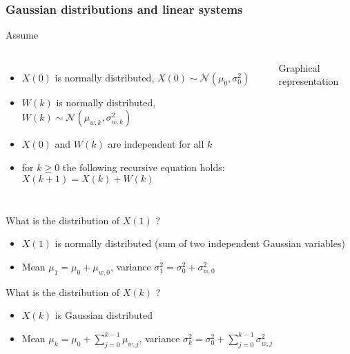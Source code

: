 \begin{frame}
	\frametitle{Gaussian distributions and linear systems}
	Assume 
	\begin{columns}
		\begin{itemize}
			\item $X(0)$ is normally distributed, $X(0)\sim\mathcal{N}(\mu_0, \sigma_0^2)$
			\item $W(k)$ is normally distributed, $W(k)\sim\mathcal{N}(\mu_{w,k}, \sigma_{w,k}^2)$
			\item $X(0)$ and $W(k)$ are independent for all $k$
			\item for $k\geq0$ the following recursive equation holds: $X(k+1) =X(k) + W(k)$
		\end{itemize}	
		\begin{block}{Graphical representation}
		\end{block}
	\end{columns}
	
	\vspace*{0.5em}

	 What is the distribution of $X(1)$ ?
	\begin{itemize}
		\item $X(1)$ is normally distributed (sum of two independent Gaussian variables)
		\item Mean $\mu_1=\mu_0+\mu_{w,0}$, variance $\sigma_1^2 = \sigma_0^2 + \sigma_{w,0}^2$
	\end{itemize}

	\vspace*{0.5em}
	 What is the distribution of $X(k)$ ?
	\begin{itemize}
		\item $X(k)$ is Gaussian distributed%
		\item Mean $\mu_k=\mu_0+\sum_{j=0}^{k-1}\mu_{w,j}$, variance $\sigma_k^2=\sigma_0^2 + \sum_{j=0}^{k-1}\sigma_{w,j}^2$
	\end{itemize}
\end{frame}

